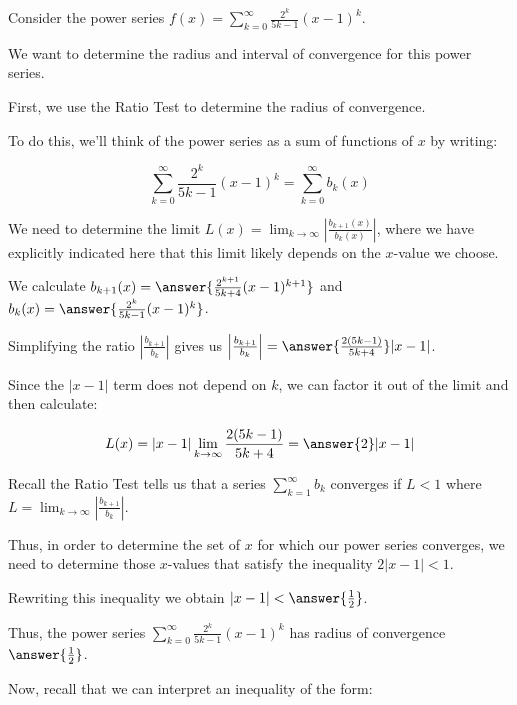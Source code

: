 \documentclass{ximera}
\author{Jim Talamo}
\begin{document}
\begin{exercise}
Consider the power series $f(x) = \sum_{k=0}^{\infty} \frac{2^k}{5k-1}(x-1)^{k}$.

We want to determine the radius and interval of convergence for this power series. 

First, we use the Ratio Test to determine the radius of convergence. 

To do this, we'll think of the power series as a sum of functions of $x$ by writing: 

\[
\sum_{k=0}^{\infty} \frac{2^k}{5k-1}(x-1)^{k} = \sum_{k=0}^{\infty} b_k(x)
\]

We need to determine the limit $L(x) = \lim_{k \to \infty} \left| \frac{b_{k+1}(x)}{b_k(x)}\right|$, where we have explicitly indicated here that this limit likely depends on the $x$-value we choose. 

We calculate $b_{k+1}(x)=\answer{\frac{2^{k+1}}{5k+4}(x-1)^{k+1}}$ and $b_k(x)=\answer{\frac{2^k}{5k-1}(x-1)^k}$. 

\begin{exercise}

Simplifying the ratio $\left|\frac{b_{k+1}}{b_k}\right|$ gives us $\left|\frac{b_{k+1}}{b_k}\right|=\answer{\frac{2(5k-1)}{5k+4}} |x-1|$.


\begin{exercise}

Since the $|x-1|$ term does not depend on $k$, we can factor it out of the limit and then calculate:

\[
L(x) = |x-1| \lim_{k \to \infty}   \frac{2(5k-1)}{5k+4}  =\answer{2} |x-1|
\]

\begin{exercise}

Recall the Ratio Test tells us that a series $\sum^{\infty}_{k=1} b_k$ converges if $L <1$ where $L=\lim_{k \to \infty}\left| \frac{b_{k+1}}{b_k}\right|$. 

Thus, in order to determine the set of $x$ for which our power series converges, we need to determine those $x$-values that satisfy the inequality $2|x-1| <1$. 

Rewriting this inequality we obtain $|x-1|< \answer{\frac{1}{2}}$. 

Thus, the  power series $\sum_{k=0}^{\infty} \frac{2^k}{5k-1}(x-1)^{k}$ has radius of convergence $\answer{\frac{1}{2}}$.

\begin{exercise}

Now, recall that we can interpret an inequality of the form:


\end{exercise}
\end{exercise}
\end{exercise}
\end{exercise}
\end{exercise}
\end{document}
